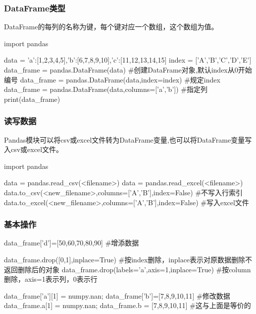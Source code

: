     \subsubsection{DataFrame类型}
      DataFrame的每列的名称为键，每个键对应一个数组，这个数组为值。
      \begin{codeblock}[language=python, caption={Create a dataframe}]
        import pandas

        data = {'a':[1,2,3,4,5],'b':[6,7,8,9,10],'c':[11,12,13,14,15]}
        index = ['A','B','C','D','E']
        data_frame = pandas.DataFrame(data) #创建DataFrame对象,默认index从0开始编号
        data_frame = pandas.DataFrame(data,index=index) #规定index
        data_frame = pandas.DataFrame(data,columns=['a','b']) #指定列
        print(data_frame)
      \end{codeblock}

    \subsubsection{读写数据}
      Pandas模块可以将csv或excel文件转为DataFrame变量,也可以将DataFrame变量写入csv或excel文件。
      \begin{codeblock}[language=python, caption={Read and write files using Pandas}]
        import pandas

        data = pandas.read_csv(<filename>)
        data = pandas.read_excel(<filename>)
        data.to_csv(<new_filename>,columns=['A','B'],index=False) #不写入行索引
        data.to_excel(<new_filename>,columns=['A','B'],index=False) #写入excel文件
      \end{codeblock}

    \subsubsection{基本操作}
      \begin{codeblock}[language=python, caption={Basic functions about DataFrame}]
        data_frame['d']=[50,60,70,80,90] #增添数据

        data_frame.drop([0,1],inplace=True) #按index删除，inplace表示对原数据删除不返回删除后的对象
        data_frame.drop(labels='a',axis=1,inplace=True) #按column删除，axis=1表示列，0表示行

        data_frame['a'][1] = numpy.nan; data_frame['b']=[7,8,9,10,11] #修改数据
        data_frame.a[1] = numpy.nan; data_frame.b = [7,8,9,10,11] #这与上面是等价的
      \end{codeblock}

